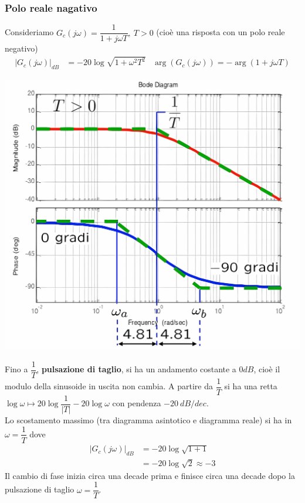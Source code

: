\documentclass{article}
\numberwithin{equation}{subsection}
\begin{document}
\subsubsection{Polo reale nagativo}
Consideriamo $G_c(j\omega) = \dfrac{1}{1+j\omega T}, \ T>0$ (cioè una risposta con un polo reale negativo)
\begin{align*}
    |G_c(j\omega)|_{dB} &= -20 \log \sqrt{1+\omega^2T^2} & \arg(G_c(j\omega)) = -\arg(1+j\omega T)
\end{align*}
\begin{center}
    \includegraphics[scale=0.125]{Images/Diagramma_polo_reale_negativo_1.png}
\end{center}
Fino a $\dfrac{1}{T}$, \textbf{pulsazione di taglio}, si ha un andamento costante a $0 dB $, cioè il modulo della sinusoide in uscita non cambia. A partire da $\dfrac{1}{T}$ si ha una retta $\log\omega \mapsto 20 \log \dfrac{1}{|T|} - 20 \log \omega$ con pendenza $-20 \ dB/dec$.\\
Lo scostamento massimo (tra diagramma asintotico e diagramma reale) si ha in $\omega = \dfrac{1}{T}$ dove
\begin{align*}
    |G_c(j\omega)|_{dB} &= -20 \log \sqrt{1+1}\\
    &= -20 \log \sqrt{2} \approx -3
\end{align*}
Il cambio di fase inizia circa una decade prima e finisce circa una
decade dopo la pulsazione di taglio $\omega = \dfrac{1}{T}$. 
\end{document}
